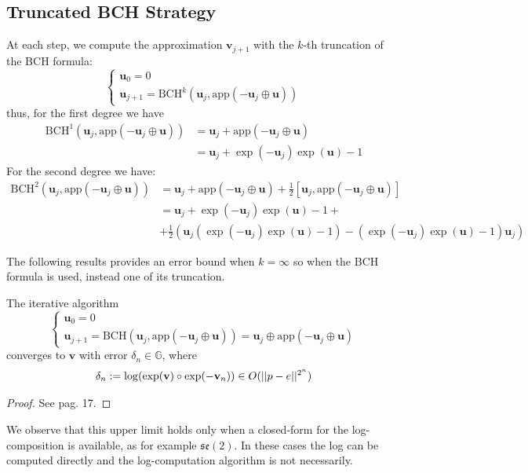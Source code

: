 \subsection{Truncated BCH Strategy}
At each step, we compute the approximation $\mathbf{v}_{j+1}$ with the $k$-th truncation of the BCH formula:
\begin{equation}\label{eq:bossa_strat}
\begin{cases}
\mathbf{u}_0 = 0 \\
\mathbf{u}_{j+1} = \text{BCH}^{k}(\mathbf{u}_{j}, \text{app}(-\mathbf{u}_{j}  \oplus  \mathbf{u} ))
\end{cases}
\end{equation}
thus, for the first degree we have 
\begin{align*}
\text{BCH}^{1}(\mathbf{u}_{j}, \text{app}(-\mathbf{u}_{j}  \oplus  \mathbf{u} ))
&=
\mathbf{u}_{j} +  \text{app}(-\mathbf{u}_{j}  \oplus  \mathbf{u} )\\
&=
\mathbf{u}_{j} + \exp(-\mathbf{u}_{j}) \exp( \mathbf{u})  - 1
\end{align*}
For the second degree we have:
\begin{align*}
\text{BCH}^{2}(\mathbf{u}_{j}, \text{app}(-\mathbf{u}_{j}  \oplus  \mathbf{u} ))
&=
\mathbf{u}_{j} +  \text{app}(-\mathbf{u}_{j}  \oplus  \mathbf{u} ) + \frac{1}{2}[\mathbf{u}_{j},  \text{app}(-\mathbf{u}_{j}  \oplus  \mathbf{u} )]\\
&=
\mathbf{u}_{j} + \exp(-\mathbf{u}_{j}) \exp( \mathbf{u})  - 1 + \\
&+ \frac{1}{2}(  \mathbf{u}_{j}( \exp(-\mathbf{u}_{j}) \exp( \mathbf{u})  - 1) -  ( \exp(-\mathbf{u}_{j}) \exp( \mathbf{u})  - 1)\mathbf{u}_{j})
\end{align*}

The following results provides an error bound when $k = \infty$ so when the BCH formula is used, instead one of its truncation.
\begin{theorem}[Bossa]\label{th:bossa}
	The iterative algorithm 
	\begin{equation}
	\begin{cases}
	\mathbf{u}_0 = 0 \\
	\mathbf{u}_{j+1} = \text{BCH}(\mathbf{u}_{j}, \text{app}(-\mathbf{u}_{j}  \oplus  \mathbf{u} ))
	                          = \mathbf{u}_{j} \oplus  \text{app}(-\mathbf{u}_{j}  \oplus  \mathbf{u} )
	\end{cases}
	\end{equation}
	converges to $\mathbf{v}$ with error $\delta_n \in \mathbb{G}$, where
	\begin{align*}
	\delta_{n} := \log(\exp(\mathbf{v})\circ \exp(-\mathbf{v}_{n})) \in O(\vert\lvert p - e \rvert\vert^{2^{n}})
	\end{align*}
\end{theorem}
\begin{proof}
See \cite{Bossa:08} pag. 17.
\end{proof}
We observe that this upper limit holds only when a closed-form for the log-composition is available, as for example $\mathfrak{se}(2)$. In these cases the log can be computed directly and the log-computation algorithm is not necessarily.

